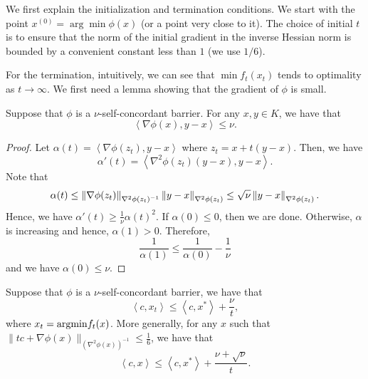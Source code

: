 We first explain the initialization and termination conditions. We
start with the point $x^{(0)}=\arg\min\phi(x)$ (or a point very close
to it). The choice of initial $t$ is to ensure that the norm of the
initial gradient in the inverse Hessian norm is bounded by a convenient
constant less than $1$ (we use $1/6$). 

For the termination, intuitively, we can see that $\min f_{t}(x_{t})$
tends to optimality as $t\rightarrow\infty$. We first need a lemma
showing that the gradient of $\phi$ is small.
\begin{lem}
Suppose that $\phi$ is a $\nu$-self-concordant barrier. For any
$x,y\in K$, we have that
\[
\left\langle \nabla\phi(x),y-x\right\rangle \leq\nu.
\]
\end{lem}

\begin{proof}
Let $\alpha(t)=\left\langle \nabla\phi(z_{t}),y-x\right\rangle $
where $z_{t}=x+t(y-x)$. Then, we have
\[
\alpha'(t)=\left\langle \nabla^{2}\phi(z_{t})(y-x),y-x\right\rangle .
\]
Note that
\[
\alpha(t)\leq\left\Vert \nabla\phi(z_{t})\right\Vert_{\nabla^{2}\phi(z_{t})^{-1}}\left\Vert y-x\right\Vert_{\nabla^{2}\phi(z_{t})}\leq\sqrt{\nu}\left\Vert y-x\right\Vert_{\nabla^{2}\phi(z_{t})}.
\]
Hence, we have $\alpha'(t)\geq\frac{1}{\nu}\alpha(t)^{2}.$ If $\alpha(0)\leq0$,
then we are done. Otherwise, $\alpha$ is increasing and hence, $\alpha(1)>0$.
Therefore, 
\[
\frac{1}{\alpha(1)}\leq\frac{1}{\alpha(0)}-\frac{1}{\nu}
\]
and we have $\alpha(0)\leq\nu$.
\end{proof}
\begin{lem}
 Suppose that $\phi$ is a $\nu$-self-concordant barrier, we have
that
\[
\left\langle c,x_{t}\right\rangle \leq\left\langle c,x^{*}\right\rangle +\frac{\nu}{t},
\]
where $x_{t}=\mathrm{argmin} f_{t}(x)$. More generally, for any $x$ such
that $\|tc+\nabla\phi(x)\|_{(\nabla^{2}\phi(x))^{-1}}\leq\frac{1}{6}$,
we have that
\[
\left\langle c,x\right\rangle \leq\left\langle c,x^{*}\right\rangle +\frac{\nu+\sqrt{\nu}}{t}.
\]
\end{lem}

